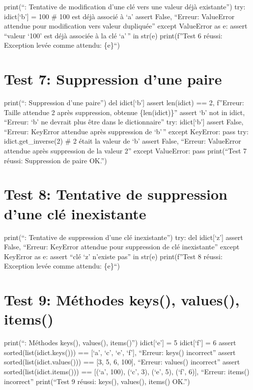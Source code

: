\documentclass[12pt,a4paper]{report}
\begin{document}
print(``: Tentative de modification d'une clé vers une valeur
déjà existante'') try: idict{[}`b'{]} = 100 \# 100 est déjà associé à
`a' assert False, ``Erreur: ValueError attendue pour modification vers
valeur dupliquée'' except ValueError as e: assert ``valeur `100' est
déjà associée à la clé `a'\,'' in str(e) print(f''Test 6 réussi:
Exception levée comme attendu: \{e\}``)

\section{Test 7: Suppression d'une
paire}\label{test-7-suppression-dune-paire}

print(``: Suppression d'une paire'') del idict{[}`b'{]} assert
len(idict) == 2, f''Erreur: Taille attendue 2 après suppression, obtenue
\{len(idict)\}'' assert `b' not in idict, ``Erreur: `b' ne devrait plus
être dans le dictionnaire'' try: idict{[}`b'{]} assert False, ``Erreur:
KeyError attendue après suppression de `b'\,'' except KeyError: pass
try: idict.get\_inverse(2) \# 2 était la valeur de `b' assert False,
``Erreur: ValueError attendue après suppression de la valeur 2'' except
ValueError: pass print(``Test 7 réussi: Suppression de paire OK.'')

\section{Test 8: Tentative de suppression d'une clé
inexistante}\label{test-8-tentative-de-suppression-dune-cluxe9-inexistante}

print(``: Tentative de suppression d'une clé inexistante'') try:
del idict{[}`z'{]} assert False, ``Erreur: KeyError attendue pour
suppression de clé inexistante'' except KeyError as e: assert ``clé `z'
n'existe pas'' in str(e) print(f''Test 8 réussi: Exception levée comme
attendu: \{e\}``)

\section{Test 9: Méthodes keys(), values(),
items()}\label{test-9-muxe9thodes-keys-values-items}

print(``: Méthodes keys(), values(), items()'') idict{[}`e'{]} =
5 idict{[}`f'{]} = 6 assert sorted(list(idict.keys())) == {[}`a', `c',
`e', `f'{]}, ``Erreur: keys() incorrect'' assert
sorted(list(idict.values())) == {[}3, 5, 6, 100{]}, ``Erreur: values()
incorrect'' assert sorted(list(idict.items())) == {[}(`a', 100), (`c',
3), (`e', 5), (`f', 6){]}, ``Erreur: items() incorrect'' print(``Test 9
réussi: keys(), values(), items() OK.'')
\end{document}
